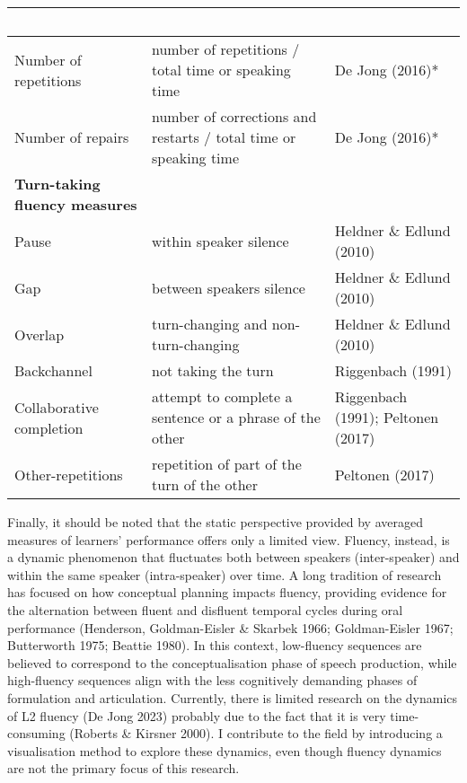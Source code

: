 \begin{flushleft}
\begin{supertabular}{|m{1.6670599in}|m{2.8441598in}|m{1.7913599in}|}
~ &
~\\\hline
Number of repetitions &
number of repetitions / total time or speaking time &
De Jong (2016)*\\\hline
Number of repairs &
number of corrections and restarts / total time or speaking time &
De Jong (2016)*\\\hline
\textbf{Turn-taking fluency measures} &
 &
\\\hline
Pause &
within speaker silence &
Heldner \& Edlund (2010)\\\hline
Gap &
between speakers silence &
Heldner \& Edlund (2010)\\\hline
Overlap &
turn-changing and non-turn-changing &
Heldner \& Edlund (2010)\\\hline
Backchannel &
not taking the turn  &
Riggenbach (1991) \\\hline
Collaborative completion &
attempt to complete a sentence or a phrase of the other &
Riggenbach (1991); Peltonen (2017)\\\hline
Other-repetitions &
repetition of part of the turn of the other &
Peltonen (2017)\\\hline
\end{supertabular}
\end{flushleft}
\begin{styleStandard}
Finally, it should be noted that the static perspective provided by averaged measures of learners’ performance offers only a limited view. Fluency, instead, is a dynamic phenomenon that fluctuates both between speakers (inter-speaker) and within the same speaker (intra-speaker) over time. A long tradition of research has focused on how conceptual planning impacts fluency, providing evidence for the alternation between fluent and disfluent temporal cycles during oral performance (Henderson, Goldman-Eisler \& Skarbek 1966; Goldman-Eisler 1967; Butterworth 1975; Beattie 1980). In this context, low-fluency sequences are believed to correspond to the conceptualisation phase of speech production, while high-fluency sequences align with the less cognitively demanding phases of formulation and articulation. Currently, there is limited research on the dynamics of L2 fluency (De Jong 2023) probably due to the fact that it is very time-consuming (Roberts \& Kirsner 2000). I contribute to the field by introducing a visualisation method to explore these dynamics, even though fluency dynamics are not the primary focus of this research.
\end{styleStandard}

